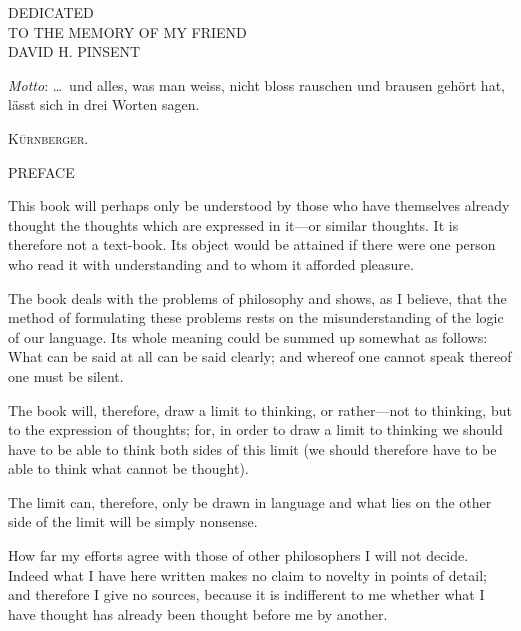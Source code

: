 \documentclass[12pt,oneside]{book}[2007/10/19]
\newcommand{\SkipToNewPage}[1]{\newpage\pagestyle{empty}
  \cleardoublepage\pagestyle{#1}
}
\newcommand{\Title}[1]{\vspace*{4.5ex}{\LARGE\bfseries #1}\vspace{9ex}}
\newcommand{\Preface}[2]{%
  \SkipToNewPage{plain}
  \phantomsection
  \pdfbookmark[0]{#2}{#2}
  \begin{center}
  \Title{#1}

  {\large \MakeUppercase{#2}}
  \end{center}
}
\newcommand{\Emph}[1]{\emph{#1}}%
\begin{document}
\SkipToNewPage{empty}
\begin{center}
\Title{Tractatus Logico-Philosophicus}

\vfill

{\small DEDICATED\\
\vspace{0.5ex}
TO THE MEMORY OF MY FRIEND\\}
\vspace{0.5ex}
DAVID H. PINSENT

\vfill
\vfill

\begin{minipage}[c]{0.85\textwidth}
\noindent\Emph{Motto}: \ldots\ und alles, was man weiss, nicht bloss rauschen
und brausen gehört hat, lässt sich in drei Worten sagen.

\vspace{-0.5\baselineskip}
\begin{flushright}
\textsc{Kürnberger.}
\end{flushright}
\end{minipage}
\end{center}
\vfill
\vfill
\vfill




\Preface{Tractatus Logico-Philosophicus}{Preface}


This book will perhaps only be understood by those
who have themselves already thought the thoughts which
are expressed in it---or similar thoughts. It is therefore
not a text-book. Its object would be attained if there
were one person who read it with understanding and to
whom it afforded pleasure.

The book deals with the problems of philosophy and
shows, as I believe, that the method of formulating these
problems rests on the misunderstanding of the logic of
our language. Its whole meaning could be summed up
somewhat as follows: What can be said at all can be said
clearly; and whereof one cannot speak thereof one must
be silent.

The book will, therefore, draw a limit to thinking,
or rather---not to thinking, but to the expression of
thoughts; for, in order to draw a limit to thinking we
should have to be able to think both sides of this limit
(we should therefore have to be able to think what cannot
be thought).

The limit can, therefore, only be drawn in language
and what lies on the other side of the limit will be simply
nonsense.

How far my efforts agree with those of other philosophers
I will not decide. Indeed what I have here
written makes no claim to novelty in points of detail;
and therefore I give no sources, because it is indifferent
to me whether what I have thought has already been
thought before me by another.
\end{document}
